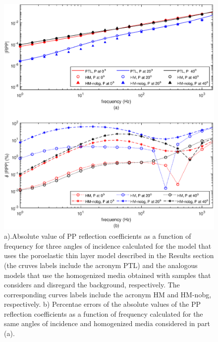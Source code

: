 \documentclass[draft]{agujournal2019}
\begin{document}
\begin{figure}[!ht]
\centering
        \includegraphics[width= 120mm, height=120mm]{rppbgcompare_2sandshale.eps}
\caption{a).Absolute value of PP reflection coefficients as a function of frequency for three angles of incidence calculated for the model that uses the poroelastic thin layer model described in the Results section (the cruves labels include the acronym PTL) and the analogous models that use the homogenized media obtained with samples that considers and disregard the background, respectively. The corresponding curves labels include the acronym HM and HM-nobg, respectively. b) Percentae errors of the absolute values of the PP reflection coefficients as a function of frequency calculated for the same angles of incidence and homogenized media considered in part (a).} 
\label{fig.5}
\end{figure}
\end{document}
